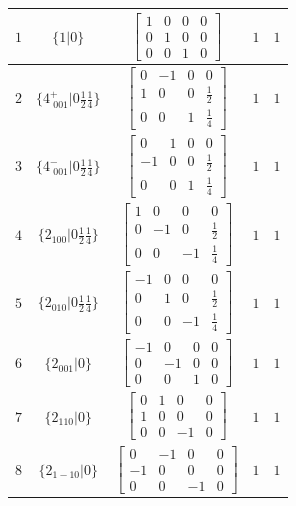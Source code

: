 \documentclass[fleqn,8pt]{jsarticle}
\begin{document}
\begin{longtable}{ccccc}
$ 1 $ & $ \{1|0\} $ & $ \begin{bmatrix} 1 & 0 & 0 & 0 \\ 0 & 1 & 0 & 0 \\ 0 & 0 & 1 & 0 \end{bmatrix} $ & $ 1 $ & $ 1 $ \\ \hline
$ 2 $ & $ \{4^{+}_{\,\,001}|0 \frac{1}{2} \frac{1}{4}\} $ & $ \begin{bmatrix} 0 & -1 & 0 & 0 \\ 1 & 0 & 0 & \frac{1}{2} \\ 0 & 0 & 1 & \frac{1}{4} \end{bmatrix} $ & $ 1 $ & $ 1 $ \\ \hline
$ 3 $ & $ \{4^{-}_{\,\,001}|0 \frac{1}{2} \frac{1}{4}\} $ & $ \begin{bmatrix} 0 & 1 & 0 & 0 \\ -1 & 0 & 0 & \frac{1}{2} \\ 0 & 0 & 1 & \frac{1}{4} \end{bmatrix} $ & $ 1 $ & $ 1 $ \\ \hline
$ 4 $ & $ \{2{}_{100}|0 \frac{1}{2} \frac{1}{4}\} $ & $ \begin{bmatrix} 1 & 0 & 0 & 0 \\ 0 & -1 & 0 & \frac{1}{2} \\ 0 & 0 & -1 & \frac{1}{4} \end{bmatrix} $ & $ 1 $ & $ 1 $ \\ \hline
$ 5 $ & $ \{2{}_{010}|0 \frac{1}{2} \frac{1}{4}\} $ & $ \begin{bmatrix} -1 & 0 & 0 & 0 \\ 0 & 1 & 0 & \frac{1}{2} \\ 0 & 0 & -1 & \frac{1}{4} \end{bmatrix} $ & $ 1 $ & $ 1 $ \\ \hline
$ 6 $ & $ \{2{}_{001}|0\} $ & $ \begin{bmatrix} -1 & 0 & 0 & 0 \\ 0 & -1 & 0 & 0 \\ 0 & 0 & 1 & 0 \end{bmatrix} $ & $ 1 $ & $ 1 $ \\ \hline
$ 7 $ & $ \{2{}_{110}|0\} $ & $ \begin{bmatrix} 0 & 1 & 0 & 0 \\ 1 & 0 & 0 & 0 \\ 0 & 0 & -1 & 0 \end{bmatrix} $ & $ 1 $ & $ 1 $ \\ \hline
$ 8 $ & $ \{2{}_{1-10}|0\} $ & $ \begin{bmatrix} 0 & -1 & 0 & 0 \\ -1 & 0 & 0 & 0 \\ 0 & 0 & -1 & 0 \end{bmatrix} $ & $ 1 $ & $ 1 $ \\ \hline

\end{longtable}
\end{document}

